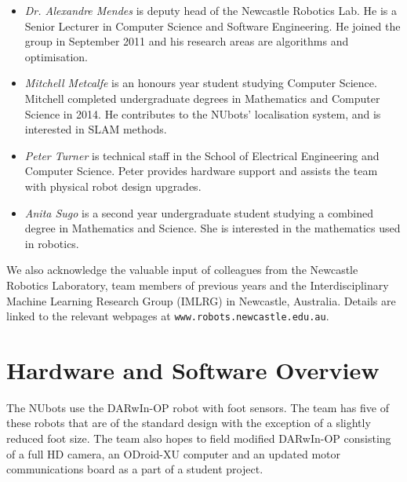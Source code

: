 \documentclass{llncs}
\begin{document}
\begin{itemize}
\item \emph{Dr. Alexandre Mendes} is deputy head of the Newcastle Robotics Lab. He is a Senior Lecturer in Computer Science and Software Engineering. He joined the group in September 2011 and his research areas are algorithms and optimisation.

\item \emph{Mitchell Metcalfe} is an honours year student studying Computer Science.
Mitchell completed undergraduate degrees in Mathematics and Computer Science in 2014.
He contributes to the NUbots' localisation system, and is interested in SLAM methods.

\item \emph{Peter Turner} is technical staff in the School of Electrical Engineering and Computer Science. Peter provides hardware support and assists the team with physical robot design upgrades. %

\item \emph{Anita Sugo} is a second year undergraduate student studying a combined degree in Mathematics and Science. She is interested in the mathematics used in robotics.

\end{itemize}

We also acknowledge the valuable input of colleagues from the Newcastle Robotics Laboratory, team members of previous years
and the Interdisciplinary Machine Learning Research Group (IMLRG) in
Newcastle, Australia. Details are linked to the relevant webpages at
\texttt{www.robots.newcastle.edu.au}.


\section{Hardware and Software Overview}
The NUbots use the DARwIn-OP robot with foot sensors. The team has five of these robots that are of the standard design with the exception of a slightly reduced foot size. The team also hopes to field modified DARwIn-OP consisting of a full HD camera, an ODroid-XU computer and an updated motor communications board as a part of a student project. %

\end{document}
